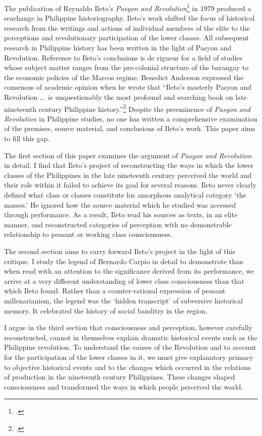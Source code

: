 The publication of Reynaldo Ileto's \textit{Pasyon and Revolution}\footcite{Ileto1979} in 1979 produced a seachange in Philippine historiography. Ileto's work shifted the focus of historical research from the writings and actions of individual members of the elite to the perceptions and revolutionary participation of the lower classes. All subsequent research in Philippine history has been written in the light of Pasyon and Revolution. Reference to Ileto's conclusions is de rigueur for a field of studies whose subject matter ranges from the pre-colonial structure of the barangay to the economic policies of the Marcos regime. Benedict Anderson expressed the consensus of academic opinion when he wrote that \enquote{Ileto's masterly Pasyon and Revolution \ldots\ is unquestionably the most profound and searching book on late nineteenth century Philippine history.}\footcite[199 fn. 19]{Anderson1998} Despite the preeminence of \textit{Pasyon and Revolution} in Philippine studies, no one has written a comprehensive examination of the premises, source material, and conclusions of Ileto's work. This paper aims to fill this gap.

The first section of this paper examines the argument of \textit{Pasyon and Revolution} in detail. I find that Ileto's project of reconstructing the ways in which the lower classes of the Philippines in the late nineteenth century perceived the world and their role within it failed to achieve its goal for several reasons. Ileto never clearly defined what class or classes constitute his amorphous analytical category \enquote*{the masses.} He ignored how the source material which he studied was accessed through performance. As a result, Ileto read his sources as texts, in an elite manner, and reconstructed categories of perception with no demonstrable relationship to peasant or working class consciousness.

The second section aims to carry forward Ileto's project in the light of this critique. I study the legend of Bernardo Carpio in detail to demonstrate than when read with an attention to the significance derived from its performance, we arrive at a very different understanding of lower class consciousness than that which Ileto found. Rather than a counter-rational expression of peasant millenarianism, the legend was the \enquote*{hidden transcript} of subversive historical memory. It celebrated the history of social banditry in the region.

I argue in the third section that consciousness and perception, however carefully reconstructed, cannot in themselves explain dramatic historical events such as the Philippine revolution. To understand the causes of the Revolution and to account for the participation of the lower classes in it, we must give explanatory primacy to objective historical events and to the changes which occurred in the relations of production in the nineteenth century Philippines. These changes shaped consciousness and transformed the ways in which people perceived the world.

